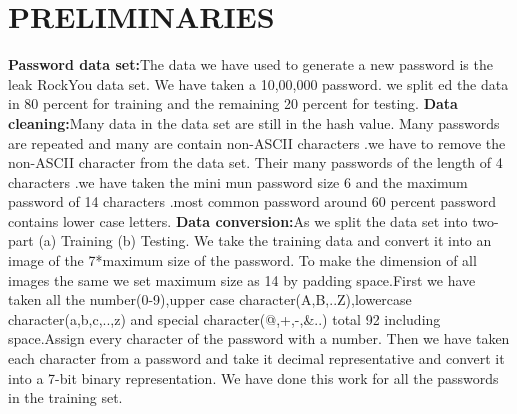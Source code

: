 \documentclass[runningheads]{llncs}
\begin{document}

\section{PRELIMINARIES}
\textbf{Password data set:}The data we have used to generate a new password is the leak RockYou data set. We have taken a 10,00,000 password. we split ed the data in 80 percent for training and the remaining 20 percent for testing.
\newline
\textbf{Data cleaning:}Many data in the data set are still in the hash value. Many passwords are repeated and many are contain non-ASCII characters .we have to remove the non-ASCII character from the data set. Their many passwords of the length of 4 characters .we have taken the mini mun password size 6 and the maximum password of 14 characters .most common password around 60 percent password contains lower case letters.
\newline
\textbf{Data conversion:}As we split the data set into two-part (a) Training (b) Testing. We take the training data and convert it into an image of the 7*maximum size of the password. To make the dimension of all images the same we set maximum size as 14 by padding space.First we have taken all the number(0-9),upper case character(A,B,..Z),lowercase character(a,b,c,..,z) and special character(@,+,-,&..) total 92 including space.Assign every character of the password with a number. Then we have taken each character from a password and take it decimal representative and convert it into a 7-bit binary representation. We have done this work for all the passwords in the training set.
\end{document}
